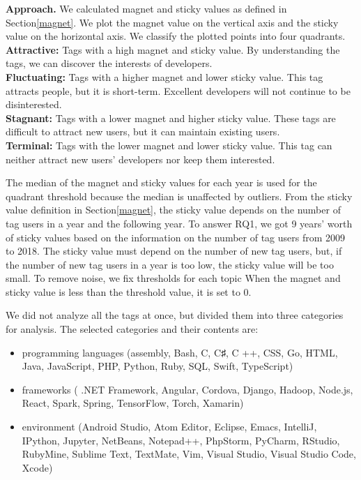 \documentclass[english,preprint,JIP,technote]{ipsj}
\begin{document}
\noindent
\textbf{Approach.}
We calculated magnet and sticky values as defined in Section\ref{magnet}. We plot the magnet value on the vertical axis and the sticky value on the horizontal axis. We classify the plotted points into four quadrants.\\
\textbf
{Attractive:} Tags with a high magnet and sticky value. By understanding the tags, we can discover the interests of developers.\\
\textbf{Fluctuating:} Tags with a higher magnet and lower sticky value. This tag attracts people, but it is short-term. Excellent developers will not continue to be disinterested.\\
\textbf{Stagnant:} Tags with a lower magnet and higher sticky value. These tags are difficult to attract new users, but it can maintain existing users.\\
\textbf{Terminal:} Tags with the lower magnet and lower sticky value. This tag can neither attract new users' developers nor keep them interested.

The median of the magnet and sticky values for each year is used for the quadrant threshold because the median is unaffected by outliers. From the sticky value definition in Section\ref{magnet}, the sticky value depends on the number of tag users in a year and the following year. To answer RQ1, we got 9 years’ worth of sticky values based on the information on the number of tag users from 2009 to 2018. The sticky value must depend on the number of new tag users, but, if the number of new tag users in a year is too low, the sticky value will be too small. To remove noise, we fix thresholds for each topic When the magnet and sticky value is less than the threshold value, it is set to 0.


We did not analyze all the tags at once, but divided them into three categories for analysis. The selected categories and their contents are:
\begin{itemize}
\item programming languages ​​(assembly, Bash, C, C♯, C ++, CSS, Go, HTML, Java, JavaScript, PHP, Python, Ruby, SQL, Swift, TypeScript)
\item frameworks ( .NET Framework, Angular, Cordova, Django, Hadoop, Node.js, React, Spark, Spring, TensorFlow, Torch, Xamarin)
\item environment (Android Studio, Atom Editor, Eclipse, Emacs, IntelliJ, IPython, Jupyter, NetBeans, Notepad++, PhpStorm, PyCharm, RStudio, RubyMine, Sublime Text, TextMate, Vim, Visual Studio, Visual Studio Code, Xcode)
\end{itemize}
\end{document}
